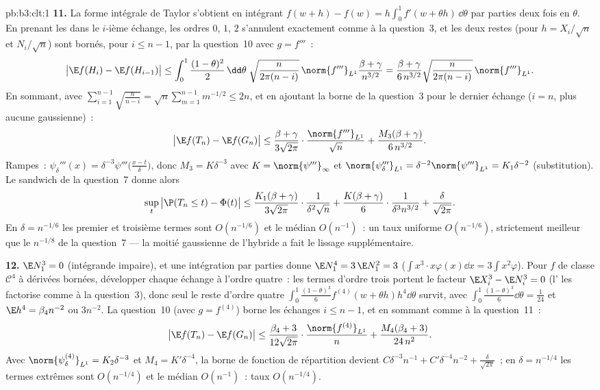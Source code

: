 \begin{solution}{pb:b3:clt:1}
\textbf{11.} La forme intégrale de Taylor s'obtient en
intégrant $f(w + h) - f(w) = h\int_0^1f'(w + \theta
h)\,\dd\theta$ par parties deux fois en $\theta$. En prenant
les  dans le $i$-ième échange, les ordres $0$, $1$,
$2$ s'annulent exactement comme à la question~3, et les deux
restes (pour $h = X_i/\sqrt n$ et $N_i/\sqrt n$) sont bornés,
pour $i \leq n - 1$, par la question~10 avec $g = f'''$~:
\[
\bigl|\E f(H_i) - \E f(H_{i-1})\bigr| \leq
\int_0^1\frac{(1-\theta)^2}2\,\dd\theta\;
\sqrt{\frac{n}{2\pi(n-i)}}\,\norm{f'''}_{L^1}
\frac{\beta + \gamma}{n^{3/2}}
= \frac{\beta + \gamma}{6\,n^{3/2}}
\sqrt{\frac{n}{2\pi(n-i)}}\,\norm{f'''}_{L^1} .
\]
En sommant, avec $\sum_{i=1}^{n-1}\sqrt{\frac n{n-i}} =
\sqrt n\sum_{m=1}^{n-1}m^{-1/2} \leq 2n$, et en ajoutant la
borne de la question~3 pour le dernier échange ($i = n$, plus
aucune gaussienne)~:
\[
\bigl|\E f(T_n) - \E f(G_n)\bigr| \leq
\frac{\beta + \gamma}{3\sqrt{2\pi}}\cdot
\frac{\norm{f'''}_{L^1}}{\sqrt n} +
\frac{M_3(\beta + \gamma)}{6\,n^{3/2}} .
\]
Rampes~: $\psi_\delta'''(x) =
\delta^{-3}\psi'''\bigl(\frac{x - t}\delta\bigr)$, donc
$M_3 = K\delta^{-3}$ avec $K = \norm{\psi'''}_\infty$ et
$\norm{\psi_\delta'''}_{L^1} = \delta^{-2}
\norm{\psi'''}_{L^1} = K_1\delta^{-2}$ (substitution). Le
sandwich de la question~7 donne alors
\[
\sup_t\,\bigl|\P(T_n \leq t) - \Phi(t)\bigr| \leq
\frac{K_1(\beta + \gamma)}{3\sqrt{2\pi}}\cdot
\frac1{\delta^2\sqrt n} +
\frac{K(\beta + \gamma)}{6}\cdot
\frac1{\delta^3n^{3/2}} + \frac\delta{\sqrt{2\pi}} .
\]
En $\delta = n^{-1/6}$ les premier et troisième termes sont
$O(n^{-1/6})$ et le médian $O(n^{-1})$~: un taux uniforme
$O(n^{-1/6})$, strictement meilleur que le $n^{-1/8}$ de la
question~7 --- la moitié gaussienne de l'hybride a fait le
lissage supplémentaire.

\textbf{12.} $\E N_1^3 = 0$ (intégrande impaire), et une
intégration par parties donne $\E N_1^4 = 3\,\E N_1^2 = 3$
($\int x^3\cdot x\varphi(x)\dd x = 3\int x^2\varphi$). Pour
$f$ de classe $\mathcal C^4$ à dérivées bornées, développer
chaque échange à l'ordre quatre~: les termes d'ordre trois
portent le facteur $\E X_i^3 - \E N_i^3 = 0$ (l'
les factorise comme à la question~3), donc seul le reste
d'ordre quatre $\int_0^1\frac{(1-\theta)^3}6f^{(4)}(w +
\theta h)h^4\dd\theta$ survit, avec $\int_0^1
\frac{(1-\theta)^3}6\dd\theta = \frac1{24}$ et $\E h^4 =
\beta_4n^{-2}$ ou $3n^{-2}$. La question~10 (avec $g =
f^{(4)}$) borne les échanges $i \leq n - 1$, et en sommant
comme à la question~11~:
\[
\bigl|\E f(T_n) - \E f(G_n)\bigr| \leq
\frac{\beta_4 + 3}{12\sqrt{2\pi}}\cdot
\frac{\norm{f^{(4)}}_{L^1}}{n} +
\frac{M_4(\beta_4 + 3)}{24\,n^2} .
\]
Avec $\norm{\psi_\delta^{(4)}}_{L^1} = K_2\delta^{-3}$ et
$M_4 = K'\delta^{-4}$, la borne de fonction de répartition
devient $C\delta^{-3}n^{-1} + C'\delta^{-4}n^{-2} +
\frac\delta{\sqrt{2\pi}}$~; en $\delta = n^{-1/4}$ les
termes extrêmes sont $O(n^{-1/4})$ et le médian $O(n^{-1})$~:
taux $O(n^{-1/4})$.


\end{solution}
